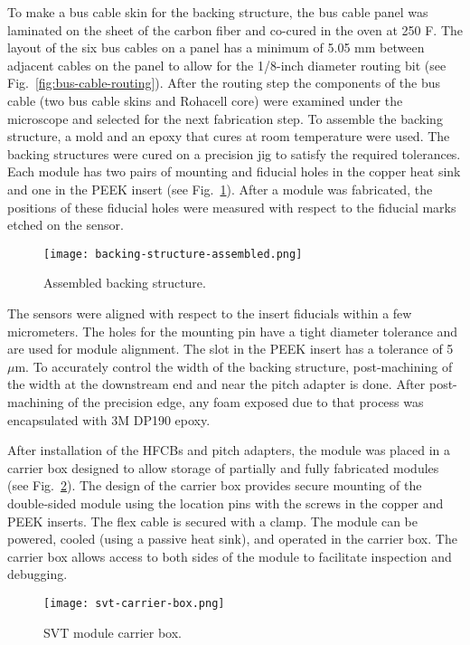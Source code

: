 To make a bus cable skin for the backing structure, the bus cable panel was laminated on the sheet of the carbon fiber and co-cured in the oven at 250 F. The layout of the six bus cables on a panel has a minimum of 5.05 mm between adjacent cables on the panel to allow for the 1/8-inch diameter routing bit (see Fig.~\ref{fig:bus-cable-routing}). After the routing step the components of the bus cable (two bus cable skins and Rohacell core) were examined under the microscope and selected for the next fabrication step. To assemble the backing structure, a mold and an epoxy that cures at room temperature were used. The backing structures were cured on a precision jig to satisfy the required tolerances. Each module has two pairs of mounting and fiducial holes in the copper heat sink and one in the PEEK insert (see Fig.~\ref{fig:backing-structure-assembled}). After a module was fabricated, the positions of these fiducial holes were measured with respect to the fiducial marks etched on the sensor. 

\begin{figure}[hbt] 
\centering 
\texttt{[image: backing-structure-assembled.png]}
\caption{Assembled backing structure.}
\label{fig:backing-structure-assembled}
\end{figure}

The sensors were aligned with respect to the insert fiducials within a few micrometers. The holes for the mounting pin have a tight diameter tolerance and are used for module alignment. The slot in the PEEK insert has a tolerance of 5~$\mu$m. To accurately control the width of the backing structure, post-machining of the width at the downstream end and near the pitch adapter is done. After post-machining of the precision edge, any foam exposed due to that process was encapsulated with 3M DP190 epoxy. 

After installation of the HFCBs and pitch adapters, the module was placed in a carrier box designed to allow storage of partially and fully fabricated modules (see Fig.~\ref{fig:svt-carrier-box}). The design of the carrier box provides secure mounting of the double-sided module using the location pins with the screws in the copper and PEEK inserts. The flex cable is secured with a clamp. The module can be powered, cooled (using a passive heat sink), and operated in the carrier box. The carrier box allows access to both sides of the module to facilitate inspection and debugging. 

\begin{figure}[hbt] 
\centering 
\texttt{[image: svt-carrier-box.png]}
\caption{SVT module carrier box.}
\label{fig:svt-carrier-box}
\end{figure}

